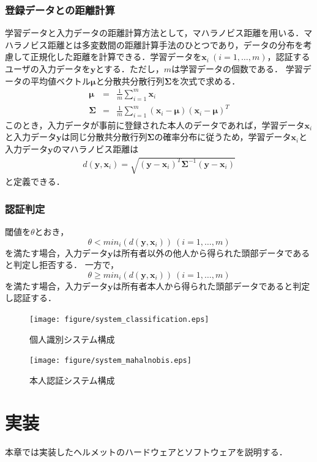\documentclass[Japanese,noauthor]{dicomopapers}
\begin{document}
\subsubsection{登録データとの距離計算}
学習データと入力データの距離計算方法として，マハラノビス距離を用いる．マハラノビス距離とは多変数間の距離計算手法のひとつであり，データの分布を考慮して正規化した距離を計算できる．学習データを$\bm{x}_i~(i=1,\dots, m)$，認証するユーザの入力データを$\bm{y}$とする．ただし，$m$は学習データの個数である．
学習データの平均値ベクトル$\bm{\mu}$と分散共分散行列$\bm{\Sigma}$を次式で求める．
\begin{eqnarray}
  \bm{\mu} &=& \frac{1}{m}\sum_{i=1}^{m}\bm{x}_i \\
  \bm{\Sigma} &=& \frac{1}{m}\sum_{i=1}^{m}(\bm{x}_i-\bm{\mu})(\bm{x}_i-\bm{\mu})^T
\end{eqnarray}
このとき，入力データが事前に登録された本人のデータであれば，学習データ$\bm{x}_i$と入力データ$\bm{y}$は同じ分散共分散行列$\bm{\Sigma}$の確率分布に従うため，学習データ$\bm{x}_i$と入力データ$\bm{y}$のマハラノビス距離は
\begin{eqnarray}
  d(\bm{y},\bm{x}_i) = \sqrt{(\bm{y}-\bm{x}_i)^{T}\bm{\Sigma}^{-1}(\bm{y}-\bm{x}_i)}
\end{eqnarray}
と定義できる．

\subsubsection{認証判定}
閾値を$\theta$とおき，
\[
  \theta < min_i(d(\bm{y},\bm{x}_i))~(i=1,\dots,m)
\]
を満たす場合，入力データ$\bm{y}$は所有者以外の他人から得られた頭部データであると判定し拒否する．
一方で，
\[
  \theta \geq min_i(d(\bm{y},\bm{x}_i))~(i=1,\dots,m)
\]
を満たす場合，入力データ$\bm{y}$は所有者本人から得られた頭部データであると判定し認証する．

\begin{figure}[!t]
  \centering
    \texttt{[image: figure/system\_classification.eps]}
  \caption{個人識別システム構成}
  \label{system_classification}
\end{figure}

\begin{figure}[!t]
  \centering
    \texttt{[image: figure/system\_mahalnobis.eps]}
  \caption{本人認証システム構成}
  \label{system_mahalnobis}
\end{figure}

\section{実装}
\label{make}
本章では実装したヘルメットのハードウェアとソフトウェアを説明する．
\end{document}
